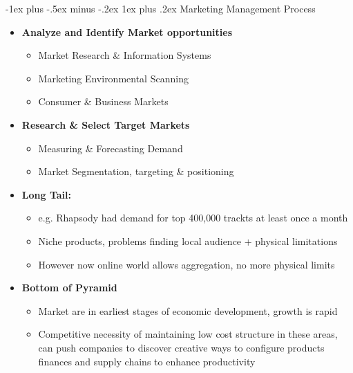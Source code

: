 \documentclass[10pt,landscape]{article}
\makeatletter
\newcommand{\subsubsubsection}{\@startsection{subsubsection}{3}{0mm}%
                                {-1ex plus -.5ex minus -.2ex}%
                                {1ex plus .2ex}%
                                {\normalfont\scriptsize\bfseries}}
\makeatother
\begin{document}
\begin{multicols*}{3}
\subsubsubsection{Marketing Management Process}
\begin{itemize}[topsep=0pt,noitemsep,wide=0pt, leftmargin=\dimexpr{} + 2\relax]
    \item \textbf{Analyze and Identify Market opportunities}
    \begin{itemize}[topsep=0pt,noitemsep,wide=0pt, leftmargin=\dimexpr{} + 2\relax]
        \item Market Research \& Information Systems
        \item Marketing Environmental Scanning
        \item Consumer \& Business Markets
    \end{itemize}
    \item \textbf{Research \& Select Target Markets}
    \begin{itemize}[topsep=0pt,noitemsep,wide=0pt, leftmargin=\dimexpr{} + 2\relax]
        \item Measuring \& Forecasting Demand
        \item Market Segmentation, targeting \& positioning
    \end{itemize}
    \item \textbf{Long Tail:}
    \begin{itemize}[topsep=0pt,noitemsep,wide=0pt, leftmargin=\dimexpr{} + 2\relax]
        \item e.g. Rhapsody had demand for top 400,000 trackts at least once a month
        \item Niche products, problems finding local audience + physical limitations
        \item However now online world allows aggregation, no more physical limits
    \end{itemize}
    \item \textbf{Bottom of Pyramid}
    \begin{itemize}[topsep=0pt,noitemsep,wide=0pt, leftmargin=\dimexpr{} + 2\relax]
        \item Market are in earliest stages of economic development, growth is rapid
        \item Competitive necessity of maintaining low cost structure in these areas, can push companies to discover creative ways to configure products finances and supply chains to enhance productivity
    \end{itemize}
\end{itemize}


\end{multicols*}
\end{document}
